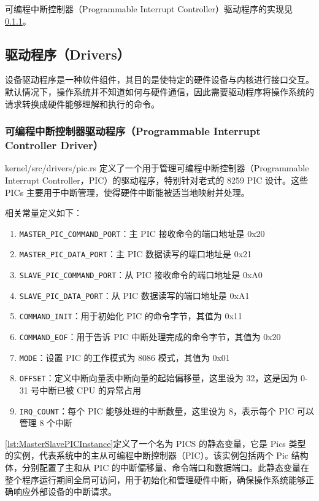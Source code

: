 可编程中断控制器（Programmable Interrupt Controller）驱动程序的实现见\cref{sec:ProgrammableInterruptControllerDriver}。

\subsection{驱动程序（Drivers）}

设备驱动程序是一种软件组件，其目的是使特定的硬件设备与内核进行接口交互。默认情况下，操作系统并不知道如何与硬件通信，因此需要驱动程序将操作系统的请求转换成硬件能够理解和执行的命令。

\subsubsection{可编程中断控制器驱动程序（Programmable Interrupt Controller Driver）}\label{sec:ProgrammableInterruptControllerDriver}

kernel/src/drivers/pic.rs 定义了一个用于管理可编程中断控制器（Programmable Interrupt Controller，PIC）的驱动程序，特别针对老式的 8259 PIC 设计。这些 PICs 主要用于中断管理，使得硬件中断能被适当地映射并处理。

相关常量定义如下：

\begin{enumerate}
    \item \texttt{MASTER\_PIC\_COMMAND\_PORT}：主 PIC 接收命令的端口地址是 0x20
    \item \texttt{MASTER\_PIC\_DATA\_PORT}：主 PIC 数据读写的端口地址是 0x21
    \item \texttt{SLAVE\_PIC\_COMMAND\_PORT}：从 PIC 接收命令的端口地址是 0xA0
    \item \texttt{SLAVE\_PIC\_DATA\_PORT}：从 PIC 数据读写的端口地址是 0xA1
    \item \texttt{COMMAND\_INIT}：用于初始化 PIC 的命令字节，其值为 0x11
    \item \texttt{COMMAND\_EOF}：用于告诉 PIC 中断处理完成的命令字节，其值为 0x20
    \item \texttt{MODE}：设置 PIC 的工作模式为 8086 模式，其值为 0x01
    \item \texttt{OFFSET}：定义中断向量表中断向量的起始偏移量，这里设为 32，这是因为 0-31 号中断已被 CPU 的异常占用
    \item \texttt{IRQ\_COUNT}：每个 PIC 能够处理的中断数量，这里设为 8，表示每个 PIC 可以管理 8 个中断
\end{enumerate}

\cref{lst:MasterSlavePICInstance}定义了一个名为 PICS 的静态变量，它是 Pics 类型的实例，代表系统中的主从可编程中断控制器（PIC）。该实例包括两个 Pic 结构体，分别配置了主和从 PIC 的中断偏移量、命令端口和数据端口。此静态变量在整个程序运行期间全局可访问，用于初始化和管理硬件中断，确保操作系统能够正确响应外部设备的中断请求。

